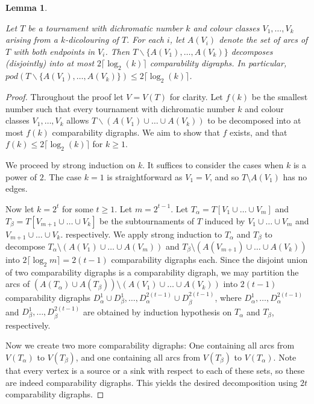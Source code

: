 \documentclass{article}
\newtheorem{lemma}{Lemma}
\begin{document}
\begin{lemma}\label{lem:boundedchrom}

Let $T$ be a tournament with dichromatic number $k$ and colour classes $V_1, \dots, V_k$ arising from a $k$-dicolouring of $T$. For each $i$, let $A(V_i)$ denote the set of arcs of $T$ with both endpoints in $V_i$. Then   $T \backslash \{A(V_1), \dots, A(V_k)\}$ decomposes (disjointly) into at most $2\lceil \log_2(k)\rceil$ comparability digraphs.
In particular, \\ $pod(T \backslash \{A(V_1), \dots, A(V_k)\}) \leq 2\lceil \log_2(k)\rceil$.
    
\end{lemma}

\begin{proof}
    Throughout the proof let $V = V(T)$ for clarity. Let $f(k)$ be the smallest number such that every tournament with dichromatic number $k$ and colour classes $V_1, \dots, V_k$ allows $T \backslash (A(V_1) \cup \dots \cup A(V_k))$ to be decomposed into at most $f(k)$ comparability digraphs. We aim to show that $f$ exists, and that $f(k) \leq 2\lceil \log_2(k)\rceil$ for $k \geq 1$.

   We proceed by strong induction on $k$. It suffices to consider the cases when $k$ is a power of $2$. The case $k = 1$ is straightforward as $V_1 = V$, and so $T \setminus A(V_1)$ has no edges. 
   
   Now let $k = 2^t$ for some $t \geq 1$. Let $ m= 2^{t-1}$. Let $T_{\alpha} =  T[V_1 \cup \dots \cup V_m]$ and $T_{\beta} = T[V_{m+1} \cup \dots \cup V_k]$ be the subtournaments of $T$ induced by $V_1 \cup \dots \cup V_m$ and $V_{m+1} \cup \dots \cup V_k$. respectively. We apply strong induction to $T_{\alpha}$ and $T_{\beta}$ to decompose $T_\alpha \setminus (A(V_1) \cup \dots \cup A(V_m))$ and $T_\beta \setminus (A(V_{m+1}) \cup \dots \cup A(V_k))$ into $2 \lceil \log_2 m \rceil = 2(t-1)$ comparability digraphs each. 
   Since the disjoint union of two comparability digraphs is a comparability digraph, we may partition the arcs of $(A(T_\alpha) \cup A(T_\beta)) \setminus (A(V_1) \cup \dots \cup A(V_k))$
   into $2(t-1)$ comparability digraphs $D_\alpha^1 \cup D_\beta^1,\dots,D_\alpha^{2(t-1)} \cup D_\beta^{2(t-1)}$, where $D_\alpha^1,\dots,D_\alpha^{2(t-1)}$ and $D_\beta^1,\dots, D_\beta^{2(t-1)}$ are obtained by induction hypothesis on $T_\alpha$ and $T_\beta$, respectively.

   Now we create two more comparability digraphs: One containing all arcs from $V(T_\alpha)$ to $V(T_\beta)$, and one containing all arcs from $V(T_\beta)$ to $V(T_\alpha)$. Note that every vertex is a source or a sink with respect to each of these sets, so these are indeed comparability digraphs. This yields the desired decomposition using $2t$ comparability digraphs. 
   \end{proof}
\end{document}
